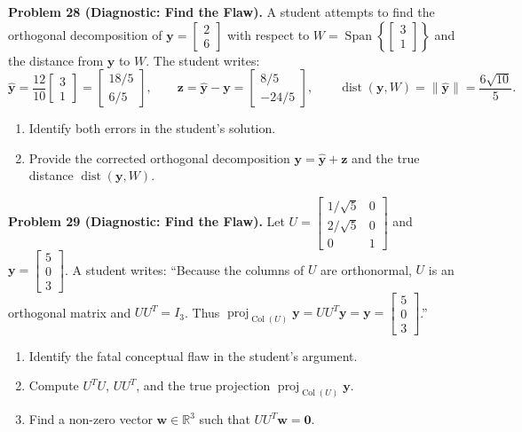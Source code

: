 \documentclass[11pt, letterpaper]{article}
\theoremstyle{definition}
\theoremstyle{remark}
\newcommand{\R}{\mathbb{R}}
\begin{document}
\textbf{Problem 28 (Diagnostic: Find the Flaw).} A student attempts to find the orthogonal decomposition of $\mathbf{y} = \begin{bmatrix} 2 \\ 6 \end{bmatrix}$ with respect to $W = \operatorname{Span}\left\{\begin{bmatrix} 3 \\ 1 \end{bmatrix}\right\}$ and the distance from $\mathbf{y}$ to $W$. The student writes:
\[
\hat{\mathbf{y}} = \frac{12}{10}\begin{bmatrix} 3 \\ 1 \end{bmatrix} = \begin{bmatrix} 18/5 \\ 6/5 \end{bmatrix}, \qquad \mathbf{z} = \hat{\mathbf{y}} - \mathbf{y} = \begin{bmatrix} 8/5 \\ -24/5 \end{bmatrix}, \qquad \operatorname{dist}(\mathbf{y}, W) = \|\hat{\mathbf{y}}\| = \frac{6\sqrt{10}}{5}.
\]
\begin{enumerate}[label=(\alph*)]
    \item Identify both errors in the student's solution.
    \item Provide the corrected orthogonal decomposition $\mathbf{y} = \hat{\mathbf{y}} + \mathbf{z}$ and the true distance $\operatorname{dist}(\mathbf{y}, W)$.
\end{enumerate}

\textbf{Problem 29 (Diagnostic: Find the Flaw).} Let $U = \begin{bmatrix} 1/\sqrt{5} & 0 \\ 2/\sqrt{5} & 0 \\ 0 & 1 \end{bmatrix}$ and $\mathbf{y} = \begin{bmatrix} 5 \\ 0 \\ 3 \end{bmatrix}$. A student writes: ``Because the columns of $U$ are orthonormal, $U$ is an orthogonal matrix and $UU^T = I_3$. Thus $\operatorname{proj}_{\operatorname{Col}(U)} \mathbf{y} = UU^T\mathbf{y} = \mathbf{y} = \begin{bmatrix} 5 \\ 0 \\ 3 \end{bmatrix}$.''
\begin{enumerate}[label=(\alph*)]
    \item Identify the fatal conceptual flaw in the student's argument.
    \item Compute $U^T U$, $UU^T$, and the true projection $\operatorname{proj}_{\operatorname{Col}(U)} \mathbf{y}$.
    \item Find a non-zero vector $\mathbf{w} \in \R^3$ such that $UU^T\mathbf{w} = \mathbf{0}$.
\end{enumerate}
\end{document}
